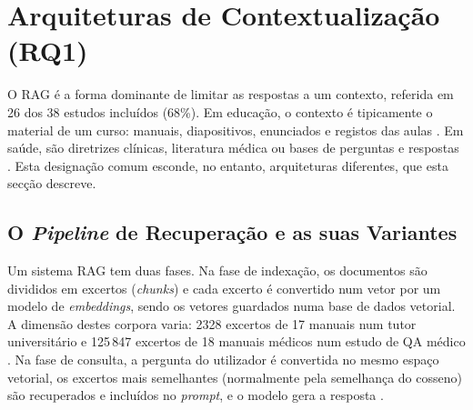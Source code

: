 \section{Arquiteturas de Contextualização (RQ1)}
\label{sec:chap2_synthesis}
\label{sec:chap2_syn_context}

O \gls{RAG} é a forma dominante de limitar as respostas a um contexto, referida em 26 dos 38 estudos incluídos (68\%). Em educação, o contexto é tipicamente o material de um curso: manuais, diapositivos, enunciados e registos das aulas \parencite{seshadri2026alan,feng2024courseassist,barzanji2026buddy,sayeed2026tutor,yan2026question}. Em saúde, são diretrizes clínicas, literatura médica ou bases de perguntas e respostas \parencite{raputri2025retrieval,nurfadhilah2025retrieval,azam2024cancerbot,christiawan2025sanity}. Esta designação comum esconde, no entanto, arquiteturas diferentes, que esta secção descreve.

\subsection{O \emph{Pipeline} de Recuperação e as suas Variantes}
\label{sec:chap2_rag_pipeline}

Um sistema \gls{RAG} tem duas fases. Na fase de indexação, os documentos são divididos em excertos (\emph{chunks}) e cada excerto é convertido num vetor por um modelo de \emph{embeddings}, sendo os vetores guardados numa base de dados vetorial. A dimensão destes corpora varia: 2328 excertos de 17 manuais num tutor universitário \parencite{sayeed2026tutor} e 125\,847 excertos de 18 manuais médicos num estudo de \gls{QA} médico \parencite{xie2026when}. Na fase de consulta, a pergunta do utilizador é convertida no mesmo espaço vetorial, os excertos mais semelhantes (normalmente pela semelhança do cosseno) são recuperados e incluídos no \emph{prompt}, e o modelo gera a resposta \parencite{azam2024cancerbot,rahat2026noise}.

